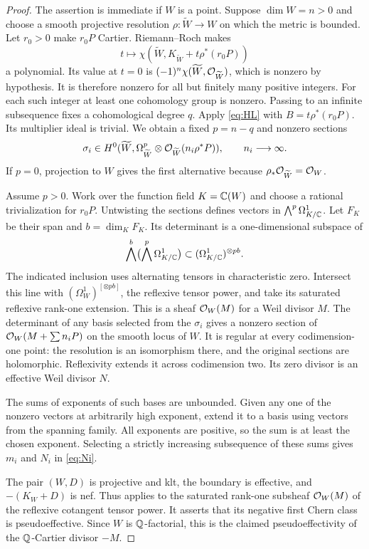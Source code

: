 \begin{proof}
The assertion is immediate if $W$ is a point. Suppose $\dim W=n>0$ and choose a smooth projective resolution $\rho:\widetilde W\to W$ on which the metric is bounded. Let $r_0>0$ make $r_0P$ Cartier. Riemann--Roch makes
\[
t\longmapsto\chi(\widetilde W,K_{\widetilde W}+t\rho^*(r_0P))
\]
a polynomial. Its value at $t=0$ is $(-1)^n\chi(\widetilde W,\mathcal O_{\widetilde W})$, which is nonzero by hypothesis. It is therefore nonzero for all but finitely many positive integers. For each such integer at least one cohomology group is nonzero. Passing to an infinite subsequence fixes a cohomological degree $q$. Apply \eqref{eq:HL} with $B=t\rho^*(r_0P)$. Its multiplier ideal is trivial. We obtain a fixed $p=n-q$ and nonzero sections
\[
\sigma_i\in H^0(\widetilde W,\Omega^p_{\widetilde W}\otimes\mathcal O_{\widetilde W}(n_i\rho^*P)),
\qquad n_i\longrightarrow\infty.
\]
If $p=0$, projection to $W$ gives the first alternative because $\rho_*\mathcal O_{\widetilde W}=\mathcal O_W$.

Assume $p>0$. Work over the function field $K=\mathbb C(W)$ and choose a rational trivialization for $r_0P$. Untwisting the sections defines vectors in $\bigwedge^p\Omega^1_{K/\mathbb C}$. Let $F_K$ be their span and $b=\dim_KF_K$. Its determinant is a one-dimensional subspace of
\[
\bigwedge^b\bigl(\bigwedge^p\Omega^1_{K/\mathbb C}\bigr)
\subset (\Omega^1_{K/\mathbb C})^{\otimes pb}.
\]
The indicated inclusion uses alternating tensors in characteristic zero. Intersect this line with $(\Omega_W^1)^{[\otimes pb]}$, the reflexive tensor power, and take its saturated reflexive rank-one extension. This is a sheaf $\mathcal O_W(M)$ for a Weil divisor $M$. The determinant of any basis selected from the $\sigma_i$ gives a nonzero section of $\mathcal O_W(M+\sum n_iP)$ on the smooth locus of $W$. It is regular at every codimension-one point: the resolution is an isomorphism there, and the original sections are holomorphic. Reflexivity extends it across codimension two. Its zero divisor is an effective Weil divisor $N$.

The sums of exponents of such bases are unbounded. Given any one of the nonzero vectors at arbitrarily high exponent, extend it to a basis using vectors from the spanning family. All exponents are positive, so the sum is at least the chosen exponent. Selecting a strictly increasing subsequence of these sums gives $m_i$ and $N_i$ in \eqref{eq:Ni}.

The pair $(W,D)$ is projective and klt, the boundary is effective, and $-(K_W+D)$ is nef. Thus \cite[Theorem~4.1]{LMPTX2023} applies to the saturated rank-one subsheaf $\mathcal O_W(M)$ of the reflexive cotangent tensor power. It asserts that its negative first Chern class is pseudoeffective. Since $W$ is $\mathbb Q$-factorial, this is the claimed pseudoeffectivity of the $\mathbb Q$-Cartier divisor $-M$.
\end{proof}

